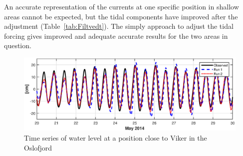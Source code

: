 An accurate representation of the currents at one specific position in shallow areas cannot be expected, but the tidal components have improved after the adjustment (Table~\ref{tab:Filtvedt}). The simply approach to adjust the tidal forcing gives improved and adequate accurate results for the two areas in question. 



\begin{figure}[!t]
\centering
\includegraphics[width=\textwidth]{fig_Viker_timeseries}
\caption{Time series of water level at a position close to Viker in the Oslofjord}
\label{fig:Viker_timeseries}
\end{figure}



